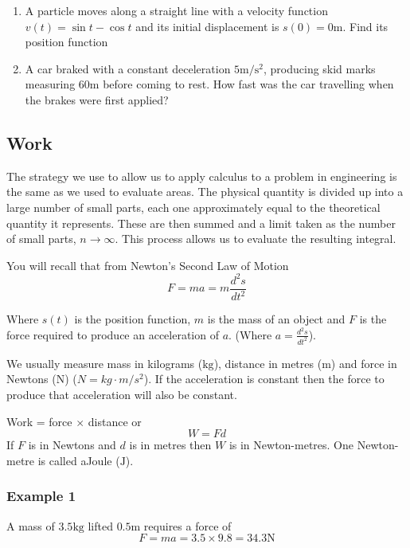 \begin{enumerate}
\item A
particle moves along a straight line with a velocity function $v (t) =\sin  t -\cos  t$ and its initial displacement is $s (0) =0 \mbox{m}$. Find its position function 

\item A
car braked with a constant deceleration $5 \mathrm{m}/\mathrm{s}^{2}$, producing skid marks measuring $60 \mbox{m}$ before coming to rest. How
fast was the car travelling when the brakes were first applied? \end{enumerate}


\subsection{Work}
The strategy we use to allow us to apply calculus to a problem in engineering is the same as we used to evaluate areas. The
physical quantity is divided up into a large number of small parts, each one approximately equal to the theoretical quantity it represents. These
are then summed and a limit taken as the number of small parts, $n \rightarrow \infty $. This process allows us to evaluate the resulting integral. 

You
will recall that from Newton's Second Law of Motion
\begin{equation}F =m a =m \frac{d^{2} s}{d t^{2}}\tag{1}
\end{equation}

Where $s (t)$ is the position function, $m$ is the mass of an object and $F$ is the force required to produce an acceleration of $a$. (Where $a =\frac{d^{2} s}{d t^{2}}$). 

We usually measure mass in kilograms ($\mbox{kg}$), distance in metres ($\mbox{m}$) and force in Newtons ($\mbox{N}$) \linebreak\relax ($N =k g \cdot m/s^{2}$). If the acceleration is constant then the force to produce that acceleration will also
be constant. 

Work = force $ \times $ distance or
\begin{equation}W =F d\tag{2}
\end{equation}If $F$ is in Newtons and $d$ is in metres then $W$ is in Newton-metres. One Newton-metre is called a\linebreak\relax Joule
($\mbox{J}$). 

\subsubsection{Example 1}
A mass of $3.5 \mbox{kg}$ lifted $0.5 \mbox{m}$ requires a force of
\begin{equation*}F =m a =3.5 \times 9.8 =34.3 \mbox{N}
\end{equation*}

